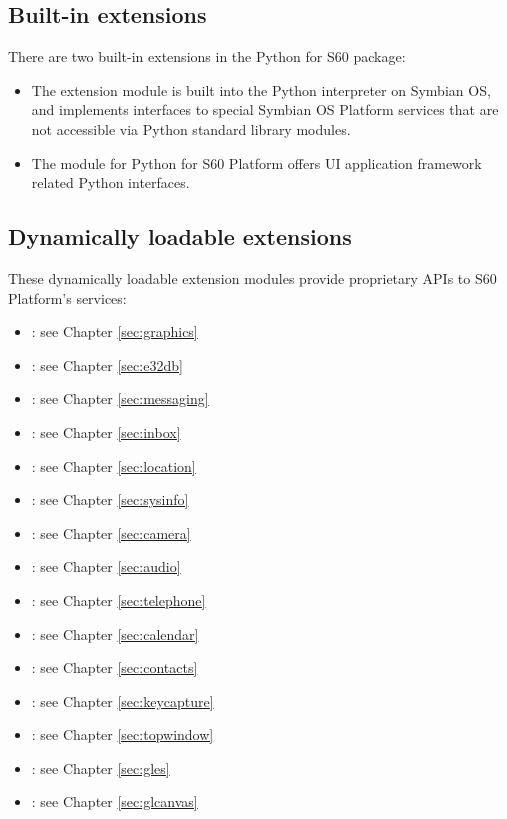 \subsection{Built-in extensions}
\label{sec:built}

There are two built-in extensions in the Python for S60 package:

\begin{itemize}
\item The  extension module is built into the Python interpreter on Symbian OS, and implements interfaces to special Symbian OS Platform services that are not accessible via Python standard library modules.
\item The  module for Python for S60 Platform offers UI application framework related Python interfaces.
\end{itemize}

\subsection{Dynamically loadable extensions}
\label{sec:dynamically}

These dynamically loadable extension modules provide proprietary APIs
to S60 Platform's services: 
\begin{itemize}
\item \mbox{}: see Chapter \ref{sec:graphics}
\item \mbox{}: see Chapter \ref{sec:e32db}
\item \mbox{}: see Chapter \ref{sec:messaging}
\item \mbox{}: see Chapter \ref{sec:inbox}
\item \mbox{}: see Chapter \ref{sec:location}
\item \mbox{}: see Chapter \ref{sec:sysinfo}
\item \mbox{}: see Chapter \ref{sec:camera}
\item \mbox{}: see Chapter \ref{sec:audio}
\item \mbox{}: see Chapter \ref{sec:telephone}
\item \mbox{}: see Chapter \ref{sec:calendar}
\item \mbox{}: see Chapter \ref{sec:contacts}
\item \mbox{}: see Chapter \ref{sec:keycapture}
\item \mbox{}: see Chapter \ref{sec:topwindow}
\item \mbox{}: see Chapter \ref{sec:gles}
\item \mbox{}: see Chapter \ref{sec:glcanvas}
\end{itemize}

